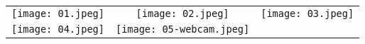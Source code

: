 \documentclass[a3paper,10pt]{article}
\newlength{\hauteur}
\begin{document}
\begin{tabular}{ccc}
	\texttt{[image: 01.jpeg]} &
	\texttt{[image: 02.jpeg]} &
	\texttt{[image: 03.jpeg]}  \\
	\texttt{[image: 04.jpeg]} &
	\texttt{[image: 05-webcam.jpeg]} &
\end{tabular}
\end{document}
